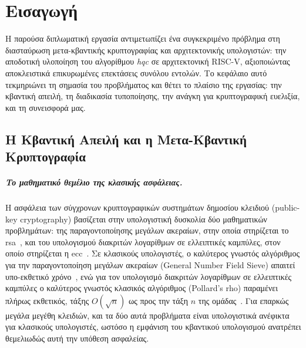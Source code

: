 \chapter{Εισαγωγή}
\label{ch:introduction}

Η παρούσα διπλωματική εργασία αντιμετωπίζει ένα συγκεκριμένο πρόβλημα στη διασταύρωση
μετα-κβαντικής κρυπτογραφίας και αρχιτεκτονικής υπολογιστών: την αποδοτική
υλοποίηση του αλγορίθμου \emph{\gls{hqc}} σε αρχιτεκτονική RISC-V, αξιοποιώντας
αποκλειστικά επικυρωμένες επεκτάσεις συνόλου εντολών. Το κεφάλαιο αυτό
τεκμηριώνει τη σημασία του προβλήματος και θέτει το πλαίσιο της εργασίας: την
κβαντική απειλή, τη διαδικασία τυποποίησης, την ανάγκη για κρυπτογραφική
ευελιξία, και τη συνεισφορά μας.

\section{Η Κβαντική Απειλή και η Μετα-Κβαντική Κρυπτογραφία}
\label{sec:quantum-threat}

\paragraph{Το μαθηματικό θεμέλιο της κλασικής ασφάλειας.}
Η ασφάλεια των σύγχρονων κρυπτογραφικών συστημάτων δημοσίου κλειδιού (public-key cryptography) βασίζεται
στην υπολογιστική δυσκολία δύο μαθηματικών προβλημάτων: της παραγοντοποίησης
μεγάλων ακεραίων, στην οποία στηρίζεται το \gls{rsa}~\cite{Rivest1978}, και του
υπολογισμού διακριτών λογαρίθμων σε ελλειπτικές καμπύλες, στον οποίο στηρίζεται
η \gls{ecc}~\cite{Koblitz1987,Miller1986}. Σε κλασικούς υπολογιστές, ο καλύτερος
γνωστός αλγόριθμος για την παραγοντοποίηση μεγάλων ακεραίων (General Number
Field Sieve) απαιτεί υπο-εκθετικό χρόνο~\cite{BLP1993-NFS}, ενώ για τον υπολογισμό διακριτών
λογαρίθμων σε ελλειπτικές καμπύλες ο καλύτερος γνωστός κλασικός αλγόριθμος
(Pollard's rho) παραμένει πλήρως εκθετικός, τάξης $O(\sqrt{n})$ ως προς την
τάξη $n$ της ομάδας~\cite{Pollard1978-rho}. Για επαρκώς μεγάλα μεγέθη κλειδιών, και τα δύο αυτά προβλήματα είναι
υπολογιστικά ανέφικτα για κλασικούς υπολογιστές, ωστόσο η εμφάνιση του
κβαντικού υπολογισμού ανατρέπει θεμελιωδώς αυτή την υπόθεση ασφαλείας.

